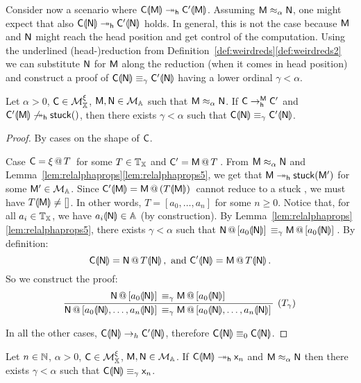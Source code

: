 Consider now a scenario where $\C\hole \mM\reddh \C'\hole{\mM}$.
Assuming $\mM\pesc\mN$, one might expect that also $\C\hole \mN\reddh \C'\hole{\mN}$ holds.
In general, this is not the case because $\mM$ and $\mN$ might reach the head position and get control of the computation.
Using the underlined (head-)reduction from Definition~\ref{def:weirdreds}\ref{def:weirdreds2} we can substitute $\mN$ for $\mM$ along the reduction (when it comes in head position) and construct a proof of $\C\hole \mN \eq[\gamma] \C'\hole\mN$ having a lower ordinal $\gamma < \alpha$.

\begin{lem}\label{lem:black_magic}
Let $\alpha > 0$, $\C\in\cMX$, $\mM,\mN\in\cM$ such that $\mM\pesc\mN$.
If $\C\redh^\mM\C'$ and $\C'\hole{\mM}\not\reddh\stuck{}$, then there exists $\gamma < \alpha$ such that $\C\hole \mN \eq[\gamma] \C'\hole\mN$.
\end{lem}

\begin{proof} By cases on the shape of $\C$.

Case $\C = \appT{\xi}{T}$ for some $T\in\Tapes[\XX]$ and $\C' = \appT{\mM}{T}$.
From  $\mM\pesc\mN$ and Lemma~\ref{lem:relalphaprops}\ref{lem:relalphaprops5}, we get that $\mM\reddh{\stuck{\mM'}}$ for some $\mM'\in\cM$.
Since $\C'\hole{\mM} = \appT{\mM}{(T\hole{\mM})}$ cannot reduce to a stuck \am, we must have $T\hole{\mM}\neq[]$.
In other words, $T = [a_0,\dots,a_n]$ for some $n\ge 0$.
Notice that, for all $a_i\in\Tapes[\XX]$, we have $a_i\hole{\mN}\in\Addrs$ (by construction).
By Lemma~\ref{lem:relalphaprops}\ref{lem:relalphaprops5}, there exists $\gamma<\alpha$ such that $\append{\mN}{a_0\hole{\mN}} \eq[\gamma] \append{\mM}{a_0\hole{\mN}}$. By definition:
\[
	\C\hole{\mN} = \appT{\mN}{T\hole{\mN}},\textrm{ and }
	\C'\hole{\mN}=\appT{\mM}{T\hole{\mN}}.
\]
So we construct the proof:
\[
	\infer[(T_\gamma)]{\append{\mN}{a_0\hole{\mN},\dots,a_n\hole{\mN}} \eq[\gamma] \append{\mM}{a_0\hole{\mN},\dots,a_n\hole{\mN}}}{
	\append{\mN}{a_0\hole{\mN}}\eq[\gamma] \append{\mM}{a_0\hole{\mN}}
	}
\]

In all the other cases, $\C\hole{\mN}\to_h\C'\hole{\mN}$, therefore $\C\hole{\mN} \eq[0]\C\hole{\mN}$.
\end{proof}

\begin{cor}\label{cor:black_magic}
Let $n\in\nat$, $\alpha > 0$, $\C\in\cMX$, $\mM,\mN\in\cM$.
If $\C\hole{\mM}\reddh\mach{x}_n$ and $\mM\pesc\mN$ then there exists $\gamma < \alpha$ such that $\C\hole{\mN} \eq[\gamma] \mach{x}_n$.
\end{cor}

